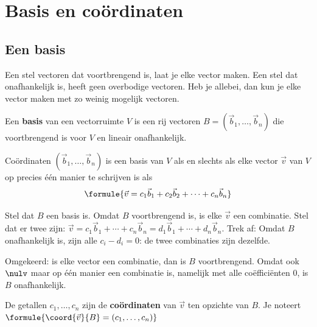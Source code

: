 \begin{oefeningen}
\end{oefeningen}

\section{Basis en coördinaten}

\subsection{Een basis}

Een stel vectoren dat voortbrengend is, laat je elke vector maken. Een stel dat onafhankelijk is, heeft geen overbodige vectoren. Heb je allebei, dan kun je elke vector maken met zo weinig mogelijk vectoren.

\begin{theorie}
Een \textbf{\textcolor{accent}{basis}} van een vectorruimte $V$ is een rij vectoren $B = (\vec b_1, \ldots, \vec b_n)$ die voortbrengend is voor $V$ en lineair onafhankelijk.

\begin{stelling}{Coördinaten}
$(\vec b_1, \ldots, \vec b_n)$ is een basis van $V$ als en slechts als elke vector $\vec v$ van $V$ op precies één manier te schrijven is als
\[ \formule{\vec v = c_1\vec b_1 + c_2\vec b_2 + \cdots + c_n\vec b_n} \]
\end{stelling}

\begin{bewijs}
Stel dat $B$ een basis is. Omdat $B$ voortbrengend is, is elke $\vec v$ een combinatie. Stel dat er twee zijn: $\vec v = c_1\vec b_1 + \cdots + c_n\vec b_n = d_1\vec b_1 + \cdots + d_n\vec b_n$. Trek af:
Omdat $B$ onafhankelijk is, zijn alle $c_i - d_i = 0$: de twee combinaties zijn dezelfde.

Omgekeerd: is elke vector een combinatie, dan is $B$ voortbrengend. Omdat ook $\nulv$ maar op één manier een combinatie is, namelijk met alle coëfficiënten 0, is $B$ onafhankelijk.
\end{bewijs}

De getallen $c_1, \ldots, c_n$ zijn de \textbf{\textcolor{accent}{coördinaten}} van $\vec v$ ten opzichte van $B$. Je noteert \quad $\formule{\coord{\vec v}{B} = (c_1, \ldots, c_n)}$
\end{theorie}

